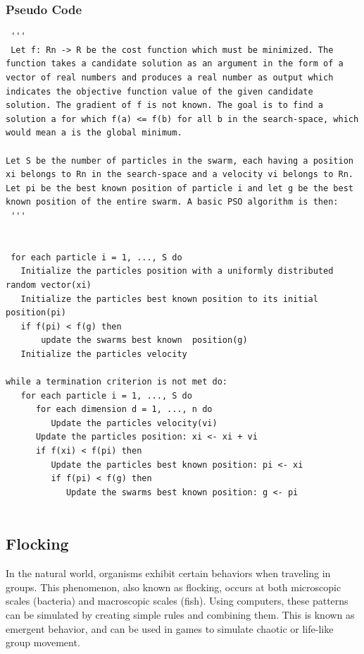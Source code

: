 \subsubsection{Pseudo Code}
\begin{verbatim}
 '''
 Let f: Rn -> R be the cost function which must be minimized. The function takes a candidate solution as an argument in the form of a vector of real numbers and produces a real number as output which indicates the objective function value of the given candidate solution. The gradient of f is not known. The goal is to find a solution a for which f(a) <= f(b) for all b in the search-space, which would mean a is the global minimum.

Let S be the number of particles in the swarm, each having a position xi belongs to Rn in the search-space and a velocity vi belongs to Rn. Let pi be the best known position of particle i and let g be the best known position of the entire swarm. A basic PSO algorithm is then:
 '''
 
 
 for each particle i = 1, ..., S do
   Initialize the particles position with a uniformly distributed random vector(xi)
   Initialize the particles best known position to its initial position(pi)
   if f(pi) < f(g) then
       update the swarms best known  position(g)
   Initialize the particles velocity
   
while a termination criterion is not met do:
   for each particle i = 1, ..., S do
      for each dimension d = 1, ..., n do
         Update the particles velocity(vi)
      Update the particles position: xi <- xi + vi
      if f(xi) < f(pi) then
         Update the particles best known position: pi <- xi
         if f(pi) < f(g) then
            Update the swarms best known position: g <- pi
            
\end{verbatim}



\subsection{Flocking}
In the natural world, organisms exhibit certain behaviors when traveling in groups. This phenomenon, also known as flocking, occurs at both microscopic scales (bacteria) and macroscopic scales (fish). Using computers, these patterns can be simulated by creating simple rules and combining them. This is known as emergent behavior, and can be used in games to simulate chaotic or life-like group movement.\cite{WikiFlocking}

